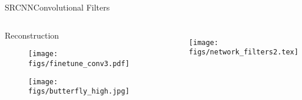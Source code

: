 \begin{frame}{SRCNN}{Convolutional Filters}
    \begin{columns}
        \begin{block}{Reconstruction}
            \begin{figure}
            \texttt{[image: figs/finetune\_conv3.pdf]}
        \end{figure}

        \begin{figure}[H]
            \centering  
            \texttt{[image: figs/butterfly\_high.jpg]}
        \end{figure}
    \end{block}
        \begin{figure}
            \texttt{[image: figs/network\_filters2.tex]}
            \vspace*{0.05cm}
        \end{figure}
\end{columns}
\end{frame}




















